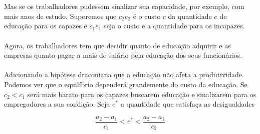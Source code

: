 \documentclass[a4paper,11pt,oneside]{book}
\theoremstyle{definition}
\theoremstyle{break}
\begin{document}
\\~\\
Mas se os trabalhadores pudessem sinalizar sua capacidade, por exemplo, com mais anos de estudo. Suporemos que $c_2e_2$ é o custo $c$ da quantidade $e$ de educação para os capazes e $c_1e_1$ seja o custo e a quantidade para os incapazes.
\\~\\
Agora, os trabalhadores tem que decidir quanto de educação adquirir e as empresas quanto pagar a mais de salário pela educação dos seus funcionários. 
\\~\\
Adicionando a hipótese draconiana que a educação não afeta a produtividade. Podemos ver que o equilíbrio dependerá grandemente do custo da educação. Se $c_2 < c_1$ será mais barato para os capazes buscarem educação e sinalizarem para os empregadores a sua condição. Seja $e^*$ a quantidade que satisfaça as desigualdades

$$ \frac{a_2 - a_1}{c_1} < e^*< \frac{a_2 - a_1}{c_2} $$
\end{document}
